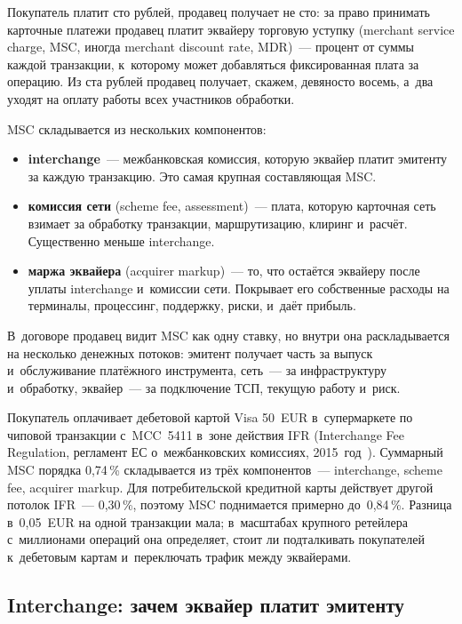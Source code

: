 Покупатель платит сто рублей, продавец получает не сто: за право принимать
карточные платежи продавец платит эквайеру торговую уступку (merchant service
charge, MSC, иногда merchant discount rate, MDR)~--- процент от
суммы каждой транзакции, к~которому может добавляться фиксированная плата за
операцию. Из ста рублей продавец получает, скажем, девяносто восемь, а~два
уходят на оплату работы всех участников обработки.

MSC складывается из нескольких компонентов:

\begin{itemize}
  \item \textbf{interchange}~--- межбанковская комиссия, которую эквайер платит
    эмитенту за каждую транзакцию. Это самая крупная составляющая MSC.
  \item \textbf{комиссия сети} (scheme fee, assessment)~--- плата, которую
    карточная сеть взимает за обработку транзакции, маршрутизацию, клиринг
    и~расчёт. Существенно меньше interchange.
  \item \textbf{маржа эквайера} (acquirer markup)~--- то, что остаётся эквайеру
    после уплаты interchange и~комиссии сети. Покрывает его собственные
    расходы на терминалы, процессинг, поддержку, риски, и~даёт прибыль.
\end{itemize}

В~договоре продавец видит MSC как одну ставку, но внутри она раскладывается на
несколько денежных потоков: эмитент получает часть за выпуск
и~обслуживание платёжного инструмента, сеть~--- за инфраструктуру и~обработку,
эквайер~--- за подключение ТСП, текущую работу и~риск.

Покупатель оплачивает дебетовой картой Visa 50~EUR в~супермаркете по чиповой
транзакции с~MCC~5411 в~зоне действия IFR (Interchange Fee Regulation,
регламент ЕС о~межбанковских комиссиях, 2015~год~\cite{eu-ifr}). Суммарный MSC
порядка 0,74\,\% складывается из трёх компонентов~--- interchange, scheme fee,
acquirer markup. Для потребительской кредитной карты действует другой потолок
IFR~--- 0,30\,\%, поэтому MSC поднимается примерно до~0,84\,\%. Разница
в~0,05~EUR на одной транзакции мала; в~масштабах крупного ретейлера
с~миллионами операций она определяет, стоит ли подталкивать
покупателей к~дебетовым картам и~переключать трафик между эквайерами.

\subsection*{Interchange: зачем эквайер платит эмитенту}


